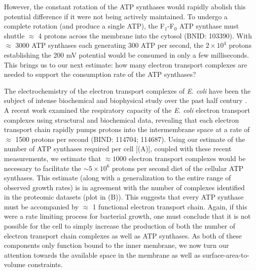 However, the constant rotation of the ATP synthases would rapidly abolish
this potential difference if it were not being actively maintained. To
undergo a complete rotation (and produce a single ATP), the F$_1$-F$_0$ ATP
synthase must shuttle $\approx$ 4 protons across the membrane into the
cytosol (BNID: 103390). With $\approx$ 3000 ATP synthases each
generating 300 ATP per second, the $2 \times 10^4$ protons establishing the 200
mV potential would be consumed in only a few milliseconds. This brings us
to our next estimate: how many electron transport complexes are needed to
support the consumption rate of the ATP synthases?

The electrochemistry of the electron transport complexes of \textit{E. coli}
have been the subject of intense biochemical and biophysical study over the
past half century \citep{ingledew1984, khademian2017,cox1970,henkel2014}. A
recent work \citep{szenk2017} examined the respiratory capacity of the
\textit{E. coli} electron transport complexes using structural and
biochemical data, revealing that each electron transport chain rapidly pumps
protons into the intermembrane space at a rate of $\approx$ 1500 protons per
second (BIND: 114704; 114687). Using our estimate of the number of ATP
synthases required per cell [(A)], coupled with these
recent measurements, we estimate that $\approx 1000$ electron transport
complexes would be necessary to facilitate the $\sim 5 \times 10^6$ protons
per second diet of the cellular ATP synthases. This estimate (along with a
generalization to the entire range of observed growth rates) is in agreement
with the number of complexes identified in the proteomic datasets (plot in
(B)). This suggests that every ATP synthase must be
accompanied by $\approx$ 1 functional electron transport chain. Again, if
this were a rate limiting process for bacterial growth, one must conclude
that it is not possible for the cell to simply increase the production of
both the number of electron transport chain complexes as well as ATP
synthases. As both of these components only function bound to the inner
membrane, we now turn our attention towards the available space in the
membrane as well as surface-area-to-volume constraints.


